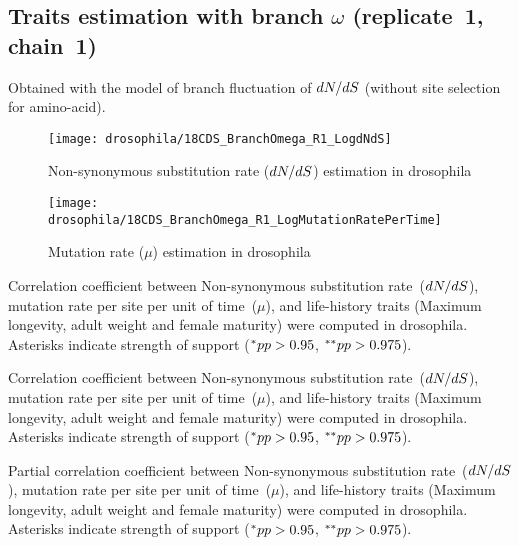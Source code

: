 \subsection{Traits estimation with branch \texorpdfstring{$\omega$}{ω} (replicate~1, chain~1)}
Obtained with the model of branch fluctuation of $\dnds$ (without site selection for amino-acid).

\begin{figure}[H]
    \centering
    \texttt{[image: drosophila/18CDS\_BranchOmega\_R1\_LogdNdS]}
    \caption[Non-synonymous {substitution} rate estimation in drosophila]{Non-synonymous {substitution} rate ($\dnds$) estimation in drosophila}
\end{figure}

\begin{figure}[H]
    \centering
    \texttt{[image: drosophila/18CDS\_BranchOmega\_R1\_LogMutationRatePerTime]}
    \caption[Mutation rate estimation in drosophila]{Mutation rate ($\mu$) estimation in drosophila}
\end{figure}


\begin{table}[H]
    
    \caption[Correlation coefficient matrix in drosophila ($\dnds$)]{
    Correlation coefficient between Non-synonymous \gls{substitution} rate~($\dnds$), mutation rate per site per unit of time~($\mu$), and life-history traits (Maximum longevity, adult weight and female maturity) were computed in drosophila.
    Asterisks indicate strength of support ($\smash{^{*}} pp > 0.95$, $\smash{^{**}} pp > 0.975$).}
\end{table}

\begin{table}[H]
    
    \caption[Covariance matrix in drosophila ($\dnds$)]{
    Correlation coefficient between Non-synonymous \gls{substitution} rate~($\dnds$), mutation rate per site per unit of time~($\mu$), and life-history traits (Maximum longevity, adult weight and female maturity) were computed in drosophila.
    Asterisks indicate strength of support ($\smash{^{*}} pp > 0.95$, $\smash{^{**}} pp > 0.975$).}
\end{table}

\begin{table}[H]
    
    \caption[Partial correlation coefficient matrix in drosophila ($\dnds$)]{
    Partial correlation coefficient between Non-synonymous \gls{substitution} rate~($\dnds$), mutation rate per site per unit of time~($\mu$), and life-history traits (Maximum longevity, adult weight and female maturity) were computed in drosophila.
    Asterisks indicate strength of support ($\smash{^{*}} pp > 0.95$, $\smash{^{**}} pp > 0.975$).}
\end{table}


